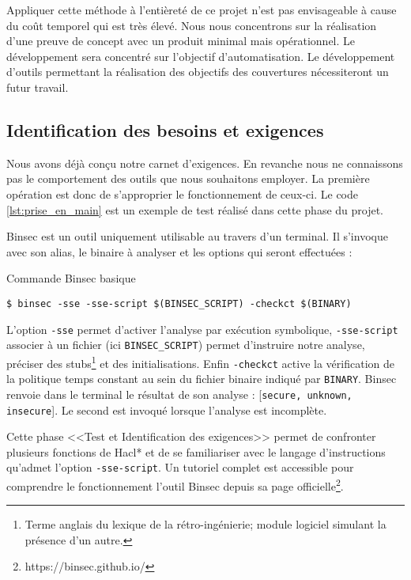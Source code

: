 Appliquer cette méthode à l'entièreté de ce projet n'est pas envisageable à cause du coût temporel qui est très élevé. Nous nous concentrons sur la réalisation d'une preuve de concept avec un produit minimal mais opérationnel. Le développement sera concentré sur l'objectif d'automatisation. Le développement d'outils permettant la réalisation des objectifs des couvertures  nécessiteront un futur travail.

\subsection*{Identification des besoins et exigences}

Nous avons déjà conçu notre carnet d'exigences. En revanche nous ne connaissons pas le comportement des outils que nous souhaitons employer. La première opération est donc de s'approprier le fonctionnement de ceux-ci. Le code \ref{lst:prise_en_main} est un exemple de test réalisé dans cette phase du projet.

Binsec est un outil uniquement utilisable au travers d'un terminal. Il s'invoque avec son alias, le binaire à analyser et les options qui seront effectuées :

\begin{listing}[!ht]
    \caption{Commande Binsec basique}
    \label{lst:commande_binsec}
    \begin{verbatim}
$ binsec -sse -sse-script $(BINSEC_SCRIPT) -checkct $(BINARY)
    \end{verbatim}
\end{listing}

L'option \texttt{-sse} permet d'activer l'analyse par exécution symbolique, \texttt{-sse-script} associer à un fichier (ici \texttt{BINSEC\_SCRIPT}) permet d'instruire notre analyse, préciser des stubs\footnote{Terme anglais du lexique de la rétro-ingénierie; module logiciel simulant la présence d'un autre.} et des initialisations. Enfin \texttt{-checkct} active la vérification de la politique temps constant au sein du fichier binaire indiqué par \texttt{BINARY}. Binsec renvoie dans le terminal le résultat de son analyse : [\texttt{secure, unknown, insecure}]. Le second est invoqué lorsque l'analyse est incomplète.\medbreak

Cette phase <<Test et Identification des exigences>> permet de confronter plusieurs fonctions de Hacl* et de se familiariser avec le langage d'instructions qu'admet l'option \texttt{-sse-script}. Un tutoriel complet est accessible pour comprendre le fonctionnement l'outil Binsec depuis sa page officielle\footnote{https://binsec.github.io/}.

